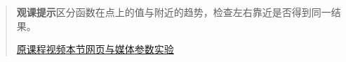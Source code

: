 \begin{quote}\small\textbf{观课提示}\quad 区分函数在点上的值与附近的趋势，检查左右靠近是否得到同一结果。

\href{https://www.youtube.com/watch?v=kfF40MiS7zA}{原课程视频}\quad\href{https://vitael04213.github.io/3blue1brown-notes/lessons/limits.html}{本节网页与媒体}\quad\href{https://vitael04213.github.io/3blue1brown-notes/lab.html\#derivative}{参数实验}
\end{quote}
